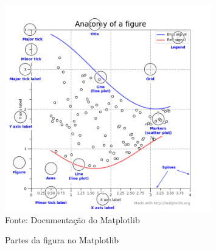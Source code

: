 \begin{itemize}
	\begin{figure}[h!]
		\centering
		\caption{Partes da figura no Matplotlib}
		\label{fig:anatomy}
		\includegraphics[width=0.8\textwidth]{figs/anatomy}\\
		\tiny{Fonte: Documentação do Matplotlib}
	\end{figure}
	

\end{itemize}
